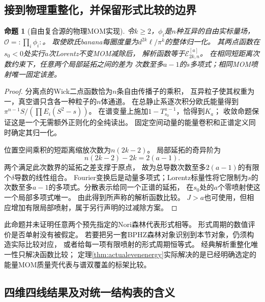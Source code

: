 \documentclass[11pt,a4paper]{ctexart}
\theoremstyle{cnplain}\newtheorem{theorem}{定理}[section]
\newtheorem{proposition}[theorem]{命题}
\theoremstyle{definition}\newtheorem{definition}[theorem]{定义}
\theoremstyle{remark}\newtheorem{remark}[theorem]{注}
\begin{document}
\subsection{接到物理重整化，并保留形式比较的边界}

\begin{proposition}[自由复合源的物理MOM实现]\label{prop:energyphysicalmom}
令$k\geq2$，$\phi_i$是$n$种互异的自由实标量场，
$\mathcal O=:\!\prod_i\phi_i\!:$。
取使欧氏banana每圈度量为$d^{2k}\ell/\pi^k$的整体归一化。
其两点函数在$s_0<0$处实行$a$次Lorentz不变MOM减除后，
解析函数等于$\mathcal E_{2k,n}^{[a]}$。
在相同短距离次数约束下，任意两个局部延拓之间的差为
次数至多$a-1$的$s$多项式；相同MOM喷射唯一固定该差。
\end{proposition}
\begin{proof}
分离点的Wick二点函数恰为$n$条自由传播子的乘积，
互异粒子使其权重为一，真空谱只含各一种粒子的$n$体通道。
在总静止系逐次积分欧氏能量得到
$\pi^{n-1}S/(\prod E_i(S^2-s))$。
在谱变量上施加$1-T_{s_0}^{a-1}$，恰得到$K_a$；
收敛命题保证这是一个无需额外正则化的全纯读出。
固定空间动量的能量卷积和正谱定义同时确定其归一化。

位置空间乘积的短距离缩放次数为$n(2k-2)$。
局部延拓的奇异阶为
\[
             n(2k-2)-2k=2(a-1).
\]
两个满足此次数界的延拓之差支撑于原点，
故为总导数次数至多$2(a-1)$的有限个$\delta$导数的线性组合。
Fourier变换后是动量多项式；Lorentz标量性将它限制为$s$的
次数至多$a-1$的多项式。分散表示给同一个正谱的延拓，
在$s_0$处的$a$个零喷射使这一个局部多项式唯一。
由此得到所声称的解析函数比较。
$J>a$也可使用，但相应增加有限局部喷射，属于另行声明的过减除方案。
\end{proof}

此命题并未证明任意两个预先指定的Nori森林代表形式相等。
形式周期的数值评价是否单射没有被假定。
若要把另一套BPHZ森林对象识别到本节对象，仍须构造实际比较对应，
或者给每一项有限喷射的形式周期恒等式。
经典解析重整化唯一性只解决函数比较；
定理\ref{thm:actualevenenergy}实际解决的是已经明确选定的
能量MOM质量壳代表与谱双覆盖的标架比较。

\subsection{四维四线结果及对统一结构表的含义}
\end{document}
